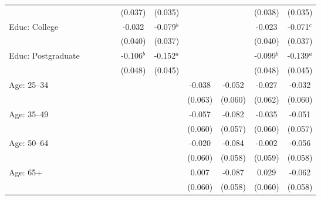 \begin{tabular}{lcccccccccc}
                             &              &              &             &             & (0.037)      & (0.035)      &             &             & (0.038)      & (0.035)\\   
   Educ: College             &              &              &             &             & -0.032       & -0.079$^{b}$ &             &             & -0.023       & -0.071$^{c}$\\   
                             &              &              &             &             & (0.040)      & (0.037)      &             &             & (0.040)      & (0.037)\\   
   Educ: Postgraduate        &              &              &             &             & -0.106$^{b}$ & -0.152$^{a}$ &             &             & -0.099$^{b}$ & -0.139$^{a}$\\   
                             &              &              &             &             & (0.048)      & (0.045)      &             &             & (0.048)      & (0.045)\\   
   Age: 25--34               &              &              &             &             &              &              & -0.038      & -0.052      & -0.027       & -0.032\\   
                             &              &              &             &             &              &              & (0.063)     & (0.060)     & (0.062)      & (0.060)\\   
   Age: 35--49               &              &              &             &             &              &              & -0.057      & -0.082      & -0.035       & -0.051\\   
                             &              &              &             &             &              &              & (0.060)     & (0.057)     & (0.060)      & (0.057)\\   
   Age: 50--64               &              &              &             &             &              &              & -0.020      & -0.084      & -0.002       & -0.056\\   
                             &              &              &             &             &              &              & (0.060)     & (0.058)     & (0.059)      & (0.058)\\   
   Age: 65+                  &              &              &             &             &              &              & 0.007       & -0.087      & 0.029        & -0.062\\   
                             &              &              &             &             &              &              & (0.060)     & (0.058)     & (0.060)      & (0.058)\\   

\end{tabular}
